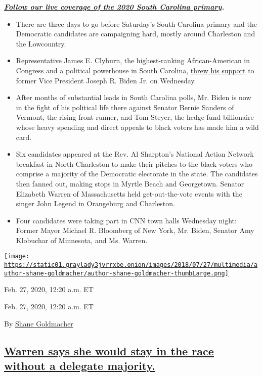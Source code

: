 \textbf{\href{https://www.nytimes3xbfgragh.onion/live/2020/south-carolina-primary-02-29}{\emph{Follow
our live coverage of the 2020 South Carolina primary}}\emph{.}}

\begin{itemize}
\item
  There are three days to go before Saturday's South Carolina primary
  and the Democratic candidates are campaigning hard, mostly around
  Charleston and the Lowcountry.
\item
  Representative James E. Clyburn, the highest-ranking African-American
  in Congress and a political powerhouse in South Carolina,
  \href{https://www.nytimes3xbfgragh.onion/live/2020/south-carolina-debate-primary-02-26\#jim-clyburn-endorsement}{threw
  his support} to former Vice President Joseph R. Biden Jr. on
  Wednesday.
\item
  After months of substantial leads in South Carolina polls, Mr. Biden
  is now in the fight of his political life there against Senator Bernie
  Sanders of Vermont, the rising front-runner, and Tom Steyer, the hedge
  fund billionaire whose heavy spending and direct appeals to black
  voters has made him a wild card.
\item
  Six candidates appeared at the Rev. Al Sharpton's National Action
  Network breakfast in North Charleston to make their pitches to the
  black voters who comprise a majority of the Democratic electorate in
  the state. The candidates then fanned out, making stops in Myrtle
  Beach and Georgetown. Senator Elizabeth Warren of Massachusetts held
  get-out-the-vote events with the singer John Legend in Orangeburg and
  Charleston.
\item
  Four candidates were taking part in CNN town halls Wednesday night:
  Former Mayor Michael R. Bloomberg of New York, Mr. Biden, Senator Amy
  Klobuchar of Minnesota, and Ms. Warren.
\end{itemize}

\href{https://www.nytimes3xbfgragh.onion/by/shane-goldmacher}{\texttt{[image: https://static01.graylady3jvrrxbe.onion/images/2018/07/27/multimedia/author-shane-goldmacher/author-shane-goldmacher-thumbLarge.png]}}

Feb. 27, 2020, 12:20 a.m. ET

Feb. 27, 2020, 12:20 a.m. ET

By \href{https://www.nytimes3xbfgragh.onion/by/shane-goldmacher}{Shane
Goldmacher}

\hypertarget{warren-says-she-would-stay-in-the-race-without-a-delegate-majority}{%
\subsection{\texorpdfstring{\protect\hyperlink{elizabeth-warren-delegates}{Warren
says she would stay in the race without a delegate
majority.}}{Warren says she would stay in the race without a delegate majority.}}\label{warren-says-she-would-stay-in-the-race-without-a-delegate-majority}}

